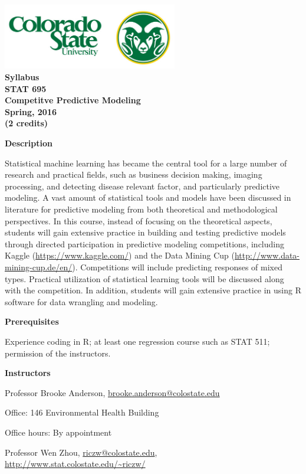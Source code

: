 \documentclass[11pt,oneside]{amsart}
\newcommand{\header}[1]{\bigbreak\textbf{#1}}
\begin{document}
\begin{center}
  \bf
  \includegraphics[width=3in]{logo} \\
  Syllabus \\
  STAT 695 \\ 
 Competitve Predictive Modeling  \\
  Spring, 2016 \\
  (2 credits)                 
\end{center}

\header{Description}

Statistical machine learning has became the central tool for a large number of research and practical fields, such as business decision making, imaging processing, and detecting disease relevant factor, and particularly predictive modeling. A vast amount of statistical tools and models have been discussed in literature for predictive modeling from both theoretical and methodological perspectives. In this course, instead of focusing on the theoretical aspects, students will gain extensive practice in building and testing predictive models through directed participation in predictive modeling competitions, including Kaggle (\url{https://www.kaggle.com/}) and the Data Mining Cup (\url{http://www.data-mining-cup.de/en/}). Competitions will include predicting responses of mixed types. Practical utilization of statistical learning tools will be discussed along with the competition. In addition, students will gain extensive practice in using R
software for data wrangling and modeling. 


\header{Prerequisites}

Experience coding in R; at least one regression course such as STAT 511; permission of the instructors.


\header{Instructors}

Professor Brooke Anderson, \url{brooke.anderson@colostate.edu}

Office: 146 Environmental Health Building

Office hours: By appointment \medskip

Professor Wen Zhou, \url{riczw@colostate.edu}, \\
\url{http://www.stat.colostate.edu/~riczw/}
\end{document}
